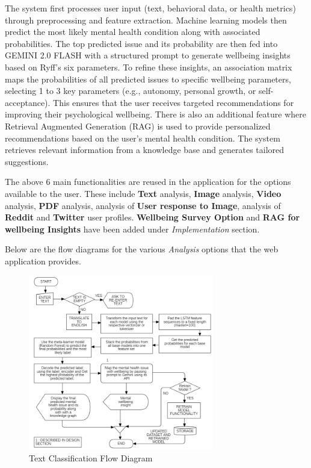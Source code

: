 \noindent
The system first processes user input (text, behavioral data, or health metrics) through preprocessing and feature extraction. Machine learning models then predict the most likely mental health condition along with associated probabilities. The top predicted issue and its probability are then fed into GEMINI 2.0 FLASH with a structured prompt to generate wellbeing insights based on Ryff’s six parameters. To refine these insights, an association matrix maps the probabilities of all predicted issues to specific wellbeing parameters, selecting 1 to 3 key parameters (e.g., autonomy, personal growth, or self-acceptance). This ensures that the user receives targeted recommendations for improving their psychological wellbeing. There is also an additional feature where Retrieval Augmented Generation (RAG) is used to provide personalized recommendations based on the user’s mental health condition. The system retrieves relevant information from a knowledge base and generates tailored suggestions.
\vspace{1em}

\noindent
The above 6 main functionalities are reused in the application for the options available to the user. These include \textbf{Text} analysis, \textbf{Image} analysis, \textbf{Video} analysis, \textbf{PDF} analysis, analysis of \textbf{User response to Image}, analysis of \textbf{Reddit} and \textbf{Twitter} user profiles. \textbf{Wellbeing Survey Option} and \textbf{RAG for wellbeing Insights} have been added under \textit{Implementation} section.

\vspace{1em}

\noindent
Below are the flow diagrams for the various \textit{Analysis} options that the web application provides.

\begin{figure}[H]  
    \centering
    \includegraphics[width=0.72\textwidth]{Images/APP TEXT OPTION.png}  
    \caption{Text Classification Flow Diagram}
    \label{012i}  %
\end{figure}

